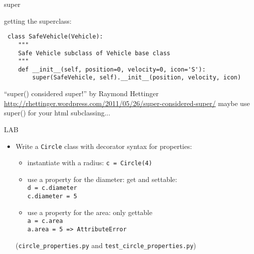\documentclass{beamer}
\begin{document}
\begin{frame}[fragile]{super}

{\Large getting the superclass:}
\begin{verbatim}
￼class SafeVehicle(Vehicle):
    """
    Safe Vehicle subclass of Vehicle base class
    """
    def __init__(self, position=0, velocity=0, icon='S'):
        super(SafeVehicle, self).__init__(position, velocity, icon)
\end{verbatim}

\vfill
{\Large ``super() considered super!'' by Raymond Hettinger }
\vfill
\url{http://rhettinger.wordpress.com/2011/05/26/super-considered-super/}
\vfill
 maybe use super() for your html subclassing...
\end{frame} 


\begin{frame}[fragile]{LAB}

\begin{itemize}
  \item Write a \verb|Circle| class with decorator syntax for properties:
  \begin{itemize}
  \item instantiate with a radius: \verb|c = Circle(4)|
  \item use a property for the diameter: get and settable:\\
        \verb|d = c.diameter| \\
        \verb|c.diameter = 5|
  \item use a property for the area: only gettable\\
        \verb|a = c.area| \\
        \verb|a.area = 5 => AttributeError|
  \end{itemize}
        (\verb|circle_properties.py| and \verb|test_circle_properties.py|)
  \vspace{0.5in}
\end{itemize}

\end{frame}



\end{document}
